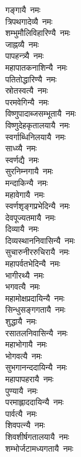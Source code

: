 \begin{multicols}{2}
\begin{flushleft}
गङ्गायै~नमः\\
त्रिपथगादेव्यै~नमः\\
शम्भुमौलिविहारिण्यै~नमः\\
जाह्नव्यै~नमः\\
पापहन्त्र्यै~नमः\\
महापातकनाशिन्यै~नमः\\
पतितोद्धारिण्यै~नमः\\
स्रोतस्वत्यै~नमः\\
परमवेगिन्यै~नमः\\
विष्णुपादाब्जसम्भूतायै~नमः\hfill{}\\
विष्णुदेहकृतालयायै~नमः\\
स्वर्गाब्धिनिलयायै~नमः\\
साध्व्यै~नमः\\
स्वर्णद्यै~नमः\\
सुरनिम्नगायै~नमः\\
मन्दाकिन्यै~नमः\\
महावेगायै~नमः\\
स्वर्णशृङ्गप्रभेदिन्यै~नमः\\
देवपूज्यतमायै~नमः\\
दिव्यायै~नमः\hfill{}\\
दिव्यस्थाननिवासिन्यै~नमः\\
सुचारुनीररुचिरायै~नमः\\
महापर्वतभेदिन्यै~नमः\\
भागीरथ्यै~नमः\\
भगवत्यै~नमः\\
महामोक्षप्रदायिन्यै~नमः\\
सिन्धुसङ्गगतायै~नमः\\
शुद्धायै~नमः\\
रसातलनिवासिन्यै~नमः\\
महाभोगायै~नमः\hfill{}\\
भोगवत्यै~नमः\\
सुभगानन्ददायिन्यै~नमः\\
महापापहरायै~नमः\\
पुण्यायै~नमः\\
परमाह्लाददायिन्यै~नमः\\
पार्वत्यै~नमः\\
शिवपत्न्यै~नमः\\
शिवशीर्षगतालयायै~नमः\\
शम्भोर्जटामध्यगतायै~नमः\\

\end{flushleft}
\end{multicols}
